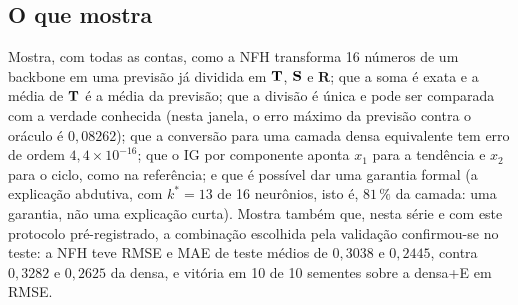 \documentclass[11pt,a4paper]{article}
\newcommand{\bR}{\mathbf{R}}\newcommand{\byh}{\hat{\mathbf{y}}}\newcommand{\bX}{\mathbf{X}}
\begin{document}
\subsection*{O que mostra}
Mostra, com todas as contas, como a NFH transforma 16 números de um backbone em uma previsão já dividida em $\mathbf{T}$, $\mathbf{S}$ e $\bR$; que a soma é exata e a média de $\mathbf{T}$ é a média da previsão; que a divisão é única e pode ser comparada com a verdade conhecida (nesta janela, o erro máximo da previsão contra o oráculo é $0,08262$); que a conversão para uma camada densa equivalente tem erro de ordem $4,4\times 10^{-16}$; que o IG por componente aponta $x_1$ para a tendência e $x_2$ para o ciclo, como na referência; e que é possível dar uma garantia formal (a explicação abdutiva, com $k^*=13$ de 16 neurônios, isto é, $81\,\%$ da camada: uma garantia, não uma explicação curta). Mostra também que, nesta série e com este protocolo pré-registrado, a combinação escolhida pela validação confirmou-se no teste: a NFH teve RMSE e MAE de teste médios de $0,3038$ e $0,2445$, contra $0,3282$ e $0,2625$ da densa, e vitória em 10 de 10 sementes sobre a densa+E em RMSE.
\end{document}
